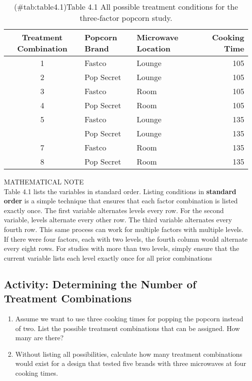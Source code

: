 \documentclass[
]{report}
\providecommand{\tightlist}{%
  \setlength{\itemsep}{0pt}\setlength{\parskip}{0pt}}
\theoremstyle{definition}
\theoremstyle{definition}
\theoremstyle{definition}
\theoremstyle{definition}
\theoremstyle{remark}
\begin{document}
\begin{table}

\caption{(\#tab:table4.1)Table 4.1 All possible treatment conditions for the three‐factor popcorn study.}
\centering
\begin{tabular}[t]{cllr}
\toprule
Treatment Combination & Popcorn Brand & Microwave Location & Cooking Time\\
\midrule
1 & Fastco & Lounge & 105\\
2 & Pop Secret & Lounge & 105\\
3 & Fastco & Room & 105\\
4 & Pop Secret & Room & 105\\
5 & Fastco & Lounge & 135\\
\addlinespace
6 & Pop Secret & Lounge & 135\\
7 & Fastco & Room & 135\\
8 & Pop Secret & Room & 135\\
\bottomrule
\end{tabular}
\end{table}

MATHEMATICAL NOTE\\
Table 4.1 lists the variables in standard order. Listing conditions in \textbf{standard order} is a simple technique
that ensures that each factor combination is listed exactly once. The first variable alternates levels every
row. For the second variable, levels alternate every other row. The third variable alternates every fourth
row. This same process can work for multiple factors with multiple levels. If there were four factors, each
with two levels, the fourth column would alternate every eight rows. For studies with more than two levels,
simply ensure that the current variable lists each level exactly once for all prior combinations

\hypertarget{activity-determining-the-number-of-treatment-combinations}{%
\subsection{Activity: Determining the Number of Treatment Combinations}\label{activity-determining-the-number-of-treatment-combinations}}

\begin{enumerate}
\def\labelenumi{\arabic{enumi}.}
\tightlist
\item
  Assume we want to use three cooking times for popping the popcorn instead of two. List the possible
  treatment combinations that can be assigned. How many are there?\\
\item
  Without listing all possibilities, calculate how many treatment combinations would exist for a design
  that tested five brands with three microwaves at four cooking times.
\end{enumerate}
\end{document}
